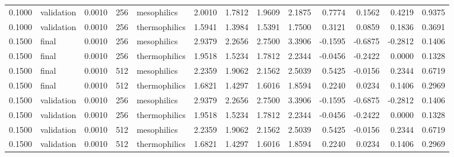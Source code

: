 \begin{tabular}{rlrrlrrrrrrrr}
0.1000 & validation & 0.0010 & 256 & mesophilics & 2.0010 & 1.7812 & 1.9609 & 2.1875 & 0.7774 & 0.1562 & 0.4219 & 0.9375 \\
0.1000 & validation & 0.0010 & 256 & thermophilics & 1.5941 & 1.3984 & 1.5391 & 1.7500 & 0.3121 & 0.0859 & 0.1836 & 0.3691 \\
0.1500 & final & 0.0010 & 256 & mesophilics & 2.9379 & 2.2656 & 2.7500 & 3.3906 & -0.1595 & -0.6875 & -0.2812 & 0.1406 \\
0.1500 & final & 0.0010 & 256 & thermophilics & 1.9518 & 1.5234 & 1.7812 & 2.2344 & -0.0456 & -0.2422 & 0.0000 & 0.1328 \\
0.1500 & final & 0.0010 & 512 & mesophilics & 2.2359 & 1.9062 & 2.1562 & 2.5039 & 0.5425 & -0.0156 & 0.2344 & 0.6719 \\
0.1500 & final & 0.0010 & 512 & thermophilics & 1.6821 & 1.4297 & 1.6016 & 1.8594 & 0.2240 & 0.0234 & 0.1406 & 0.2969 \\
0.1500 & validation & 0.0010 & 256 & mesophilics & 2.9379 & 2.2656 & 2.7500 & 3.3906 & -0.1595 & -0.6875 & -0.2812 & 0.1406 \\
0.1500 & validation & 0.0010 & 256 & thermophilics & 1.9518 & 1.5234 & 1.7812 & 2.2344 & -0.0456 & -0.2422 & 0.0000 & 0.1328 \\
0.1500 & validation & 0.0010 & 512 & mesophilics & 2.2359 & 1.9062 & 2.1562 & 2.5039 & 0.5425 & -0.0156 & 0.2344 & 0.6719 \\
0.1500 & validation & 0.0010 & 512 & thermophilics & 1.6821 & 1.4297 & 1.6016 & 1.8594 & 0.2240 & 0.0234 & 0.1406 & 0.2969 \\
\bottomrule
\end{tabular}
